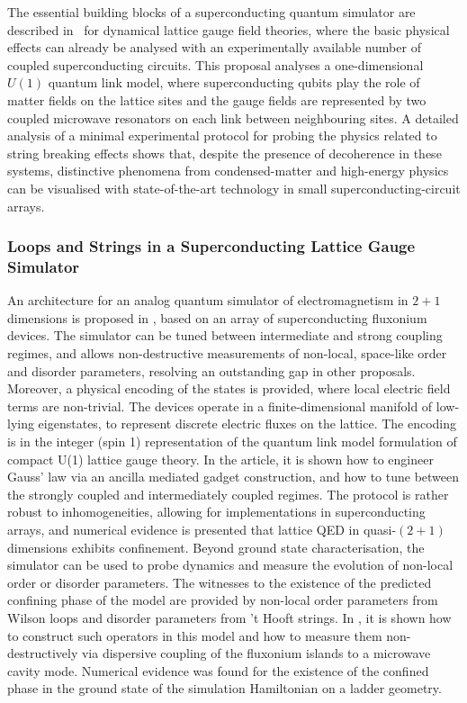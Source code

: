 \documentclass[epj,final]{svjour}
\begin{document}
The essential building blocks of a superconducting quantum simulator are described in~\cite{marcos2013superconducting} for dynamical lattice gauge field theories, where the basic physical effects can already be analysed with an experimentally available number of coupled superconducting circuits. This proposal analyses a one-dimensional $U(1)$ quantum link model, where superconducting qubits play the role of matter fields on the lattice sites and the gauge fields are represented by two coupled microwave resonators on each link between neighbouring sites. A detailed analysis of a minimal experimental protocol for probing the physics related to string breaking effects shows that, despite the presence of decoherence in these systems, distinctive phenomena from condensed-matter and high-energy physics can be visualised with state-of-the-art technology in small superconducting-circuit arrays.

\subsubsection{Loops and Strings in a Superconducting Lattice Gauge Simulator\cite{brennen2016loops}}

An architecture for an analog quantum simulator of electromagnetism in $2+1$ dimensions is proposed in \cite{brennen2016loops}, based on an array of superconducting fluxonium devices. The simulator can be tuned between intermediate and strong coupling regimes, and allows non-destructive measurements of non-local, space-like order and disorder parameters, resolving an outstanding gap in other proposals. Moreover, a physical encoding of the states is provided, where local electric field terms are non-trivial. The devices operate in a finite-dimensional manifold of low-lying eigenstates, to represent discrete electric fluxes on the lattice. The encoding is in the integer (spin 1) representation of the quantum link model formulation of compact U(1) lattice gauge theory.  In the article, it is shown how to engineer Gauss' law via an ancilla mediated gadget construction, and how to tune between the strongly coupled and intermediately coupled regimes. The protocol is rather robust to inhomogeneities, allowing for implementations in superconducting arrays, and numerical evidence is presented that lattice QED in quasi-$(2+1)$ dimensions exhibits confinement. Beyond ground state characterisation, the simulator can be used to probe dynamics and measure the evolution of non-local order or disorder parameters. The witnesses to the existence of the predicted confining phase of the model are provided by non-local order parameters from Wilson loops and disorder parameters from 't Hooft strings. In \cite{brennen2016loops}, it is shown how to construct such operators in this model and how to measure them non-destructively via dispersive coupling of the fluxonium islands to a microwave cavity mode. Numerical evidence was found for the existence of the confined phase in the ground state of the simulation Hamiltonian on a ladder geometry.
\end{document}
